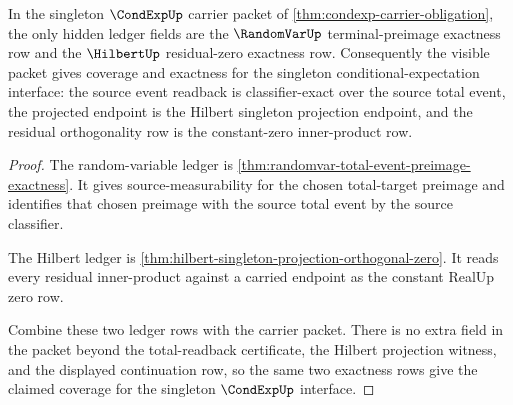 \begin{theorem}
\label{thm:condexp-ledger-exactness-obligation}
In the singleton $\CondExpUp$ carrier packet of
\autoref{thm:condexp-carrier-obligation}, the only hidden ledger fields are
the $\RandomVarUp$ terminal-preimage exactness row and the $\HilbertUp$
residual-zero exactness row. Consequently the visible packet gives coverage
and exactness for the singleton conditional-expectation interface: the source
event readback is classifier-exact over the source total event, the projected
endpoint is the Hilbert singleton projection endpoint, and the residual
orthogonality row is the constant-zero inner-product row.
\end{theorem}
\begin{proof}
The random-variable ledger is
\autoref{thm:randomvar-total-event-preimage-exactness}. It gives
source-measurability for the chosen total-target preimage and identifies that
chosen preimage with the source total event by the source classifier.

The Hilbert ledger is
\autoref{thm:hilbert-singleton-projection-orthogonal-zero}. It reads every
residual inner-product against a carried endpoint as the constant RealUp zero
row.

Combine these two ledger rows with the carrier packet. There is no extra
field in the packet beyond the total-readback certificate, the Hilbert
projection witness, and the displayed continuation row, so the same two
exactness rows give the claimed coverage for the singleton
$\CondExpUp$ interface.
\end{proof}

